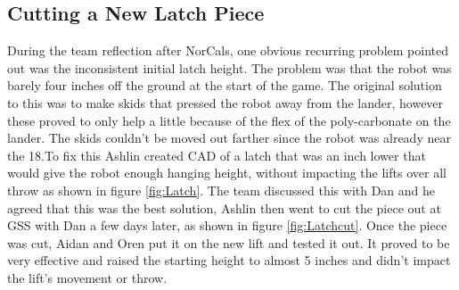 \documentclass{article}
\begin{document}
\subsection{Cutting a New Latch Piece}
During the team reflection after NorCals, one obvious recurring problem pointed out was the inconsistent initial latch height. The problem was that the robot was barely four inches off the ground at the start of the game. The original solution to this was to make skids that pressed the robot away from the lander, however these proved to only help a little because of the flex of the poly-carbonate on the lander. The skids couldn't be moved out farther since the robot was already near the 18.To fix this Ashlin created CAD of a latch that was an inch lower that would give the robot enough hanging height, without impacting the lifts over all throw as shown in figure \ref{fig:Latch}. The team discussed this with Dan and he agreed that this was the best solution, Ashlin then went to cut the piece out at GSS with Dan a few days later, as shown in figure  \ref{fig:Latchcut}. Once the piece was cut, Aidan and Oren put it on the new lift and tested it out. It proved to be very effective and raised the starting height to almost 5 inches and didn't impact the lift's movement or throw.
\end{document}
